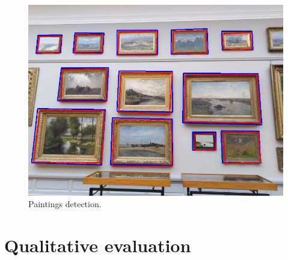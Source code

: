 \begin{figure}[h]
    \includegraphics[width=\linewidth]{images/IMG_20190323_121447.jpg}
    \caption{Paintings detection.}
    \label{fig:paiting_detection_with_ground_truth}
\end{figure}

\section{Qualitative evaluation}
